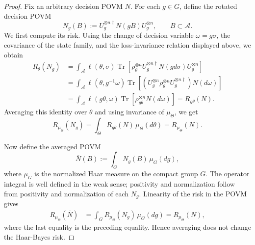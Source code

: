 \documentclass[journal]{IEEEtran}
\begin{document}
\begin{proof}
Fix an
arbitrary decision POVM \(N\).  For each \(g\in G\), define the rotated decision
POVM
\[
    N_g(B)
    :=
    U_g^{\otimes n\dagger}N(gB)U_g^{\otimes n},
    \qquad B\subset\mathcal A.
    \label{eq:rotated_decision_povm_def}
\]
We first compute its risk.  Using the change of decision variable
\(\omega=g\sigma\), the covariance of the state family, and the
loss-invariance relation displayed above, we obtain
\[
\begin{aligned}
    R_\theta(N_g)
    &=
    \int_{\mathcal A}
    \ell(\theta,\sigma)
    \operatorname{Tr}\!\left[
        \rho_\theta^{\otimes n}
        U_g^{\otimes n\dagger}N(gd\sigma)U_g^{\otimes n}
    \right]                                                   \\
    &=
    \int_{\mathcal A}
    \ell(\theta,g^{-1}\omega)
    \operatorname{Tr}\!\left[
        (U_g^{\otimes n}\rho_\theta^{\otimes n}U_g^{\otimes n\dagger})
        N(d\omega)
    \right]                                                   \\
    &=
    \int_{\mathcal A}
    \ell(g\theta,\omega)
    \operatorname{Tr}\!\left[
        \rho_{g\theta}^{\otimes n}N(d\omega)
    \right]                                                   
    =
    R_{g\theta}(N).
\end{aligned}
\]
Averaging this identity over \(\theta\) and using invariance of
\(\mu_\Theta\), we get
\[
    R_{\mu_\Theta}(N_g)
    =
    \int_\Theta R_{g\theta}(N)\,\mu_\Theta(d\theta)
    =
    R_{\mu_\Theta}(N).
\]

Now define the averaged POVM
\[
    \overline N(B)
    :=
    \int_G N_g(B)\,\mu_G(dg),
    \label{eq:averaged_decision_povm_def}
\]
where \(\mu_G\) is the normalized Haar measure on the compact group \(G\).  The
operator integral is well defined in the weak sense; positivity and
normalization follow from positivity and normalization of each \(N_g\).
Linearity of the risk in the POVM gives
\[
\begin{aligned}
    R_{\mu_\Theta}(\overline N)
    &=
    \int_G R_{\mu_\Theta}(N_g)\,\mu_G(dg) 
    =
    R_{\mu_\Theta}(N),
\end{aligned}
\]
where the last equality is the preceding equality.  Hence averaging
does not change the Haar-Bayes risk.


\end{proof}
\end{document}
